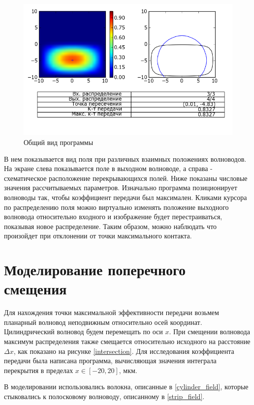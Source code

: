 \begin{figure}[h!]
	\includegraphics[width=\linewidth]{img/heatmap.png}
	\caption{Общий вид программы}
\end{figure}

В нем показывается вид поля при различных взаимных положениях волноводов. На экране слева показывается поле в выходном волноводе, а справа - схематическое расположение перекрывающихся полей. Ниже показаны числовые значения рассчитываемых параметров. Изначально программа позиционирует волноводы так, чтобы коэффициент передачи был максимален. Кликами курсора по распределению поля можно виртуально изменять положение выходного волновода относительно входного и изображение будет перестраиваться, показывая новое распределение. Таким образом, можно наблюдать что произойдет при отклонении от точки максимального контакта.

\section{Моделирование поперечного смещения}
\label{transverse_section}

Для нахождения точки максимальной эффективности передачи возьмем планарный волновод неподвижным относительно осей координат. Цилиндрический волновод будем перемещать по оси $x$. При смещении волновода максимум распределения также смещается относительно исходного на расстояние $\Delta x$, как показано на рисунке \ref{intersection}. Для исследования коэффициента передачи была написана программа, вычисляющая значения интеграла перекрытия в пределах $x \in [-20, 20]$, мкм.

В моделировании использовались волокна, описанные в \ref{cylinder_field}, которые стыковались к полосковому волноводу, описанному в \ref{strip_field}.

